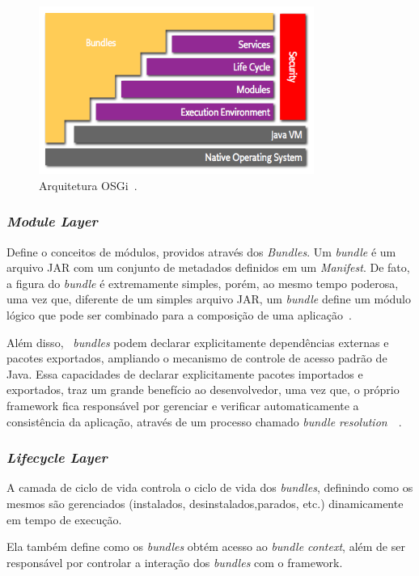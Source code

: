 \begin{figure}[htp]
\centering
\includegraphics[width=9cm]{chapters/chapter2/arch-osgi.png}
\caption[Arquitetura OSGi]{Arquitetura OSGi~\cite{osgiorg}.}
\label{fig:arch_osgi}
\end{figure}


\subsubsection{\textit{Module Layer}}
Define o conceitos de módulos, providos através dos \textit{Bundles}. Um \textit{bundle} é um arquivo JAR com um conjunto de metadados definidos em um \textit{Manifest}. De fato, a figura do \textit{bundle} é extremamente simples, porém, ao mesmo tempo poderosa, uma vez que, diferente de um simples arquivo JAR, um \textit{bundle} define um módulo lógico que pode ser combinado para a composição de uma aplicação~\cite{hall2010osgi}.

Além disso, ~\textit{bundles} podem declarar explicitamente dependências externas e pacotes exportados, ampliando o mecanismo de controle de acesso padrão de Java. Essa capacidades de declarar explicitamente pacotes importados e exportados, traz um grande benefício ao desenvolvedor, uma vez que, o próprio framework fica responsável por gerenciar e verificar automaticamente a consistência da aplicação, através de um processo chamado \textit{bundle resolution}~\cite{hall2010osgi}~\cite{osgiorg}.

\subsubsection{\textit{Lifecycle Layer}}
A camada de ciclo de vida controla o ciclo de vida dos \textit{bundles}, definindo como os mesmos são gerenciados (instalados, desinstalados,parados, etc.) dinamicamente em tempo de execução.

Ela também define como os \textit{bundles} obtém acesso ao \textit{bundle context}, além de ser responsável por controlar a interação dos \textit{bundles} com o framework.

